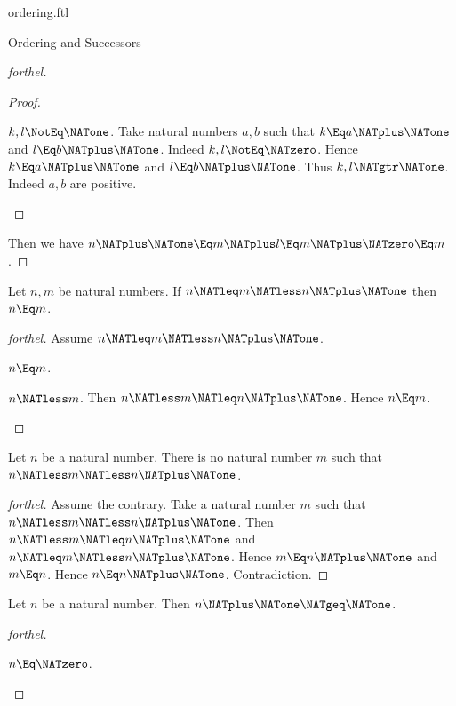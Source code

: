 \documentclass{stex}
\begin{document}
\begin{smodule}{ordering.ftl}
\begin{sfragment}{Ordering and Successors}
\begin{proof}[forthel]
\begin{proof}
      \begin{case}{$k, l \NotEq \NATone$.}
        Take natural numbers $a, b$ such that $k \Eq a \NATplus \NATone$ and $l \Eq b \NATplus \NATone$.
        Indeed $k, l \NotEq \NATzero$.
        Hence $k \Eq a \NATplus \NATone$ and $l \Eq b \NATplus \NATone$.
        Thus $k, l \NATgtr \NATone$. Indeed $a, b$ are positive.
      \end{case}
    \end{proof}

    Then we have $n \NATplus \NATone
      \Eq m \NATplus l
      \Eq m \NATplus \NATzero
      \Eq m$.
  \end{proof}

  \begin{proposition}[forthel]
    Let $n, m$ be natural numbers.
    If $n \NATleq m \NATless n \NATplus \NATone$ then $n \Eq m$.
  \end{proposition}
  \begin{proof}[forthel]
    Assume $n \NATleq m \NATless n \NATplus \NATone$.

    \begin{case}{$n \Eq m$.} \end{case}

    \begin{case}{$n \NATless m$.}
      Then $n \NATless m \NATleq n \NATplus \NATone$.
      Hence $n \Eq m$.
    \end{case}
  \end{proof}

  \begin{corollary}[forthel]
    Let $n$ be a natural number.
    There is no natural number $m$ such that $n \NATless m \NATless n \NATplus \NATone$.
  \end{corollary}
  \begin{proof}[forthel]
    Assume the contrary.
    Take a natural number $m$ such that $n \NATless m \NATless n \NATplus \NATone$.
    Then $n \NATless m \NATleq n \NATplus \NATone$ and $n \NATleq m \NATless n \NATplus \NATone$.
    Hence $m \Eq n \NATplus \NATone$ and $m \Eq n$.
    Hence $n \Eq n \NATplus \NATone$.
    Contradiction.
  \end{proof}

  \begin{proposition}[forthel]
    Let $n$ be a natural number.
    Then $n \NATplus \NATone \NATgeq \NATone$.
  \end{proposition}
  \begin{proof}[forthel]
    \begin{case}{$n \Eq \NATzero$.} \end{case}


\end{proof}
\end{sfragment}
\end{smodule}
\end{document}
